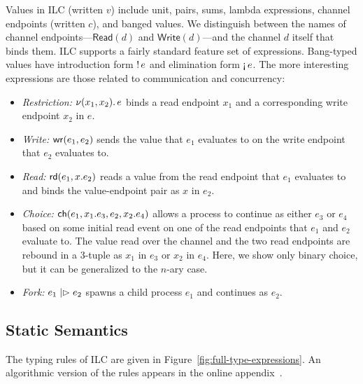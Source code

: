 Values in ILC (written $v$) include unit, pairs, sums, lambda expressions,
channel endpoints (written $c$), and banged values. We distinguish between the
names of channel endpoints---$\mathsf{Read}(d)$ and $\mathsf{Write}(d)$---and
the channel $d$ itself that binds them. ILC supports a fairly standard feature
set of expressions. Bang-typed values have introduction form ${!}\,{e}$ and
elimination form $\textnormal{!`}\,{e}$. The more interesting expressions are those
related to communication and concurrency:
\begin{itemize}[leftmargin=*]
  \item \emph{Restriction:} $\nu(x_1, x_2).\,e$ binds a read endpoint $x_1$ and
    a corresponding write endpoint $x_2$ in $e$.
  \item \emph{Write:} $\textnormal{\textsf{wr}}\mathsf{(}{e_1},{e_2}\mathsf{)}$ sends the value that $e_1$ evaluates to on
    the write endpoint that $e_2$ evaluates to.
  \item \emph{Read:} $\textnormal{\textsf{rd}}\mathsf{(}{e_1},{x}.{e_2}\mathsf{)}$ reads a value from the read endpoint
    that $e_1$ evaluates to and binds the value-endpoint pair as $x$ in $e_2$.
  \item \emph{Choice:} $\textnormal{\textsf{ch}}\mathsf{(}{e_1},{x_1}.{e_3},{e_2},{x_2}.{e_4}\mathsf{)}$ allows a
    process to continue as either $e_3$ or $e_4$ based on some initial read
    event on one of the read endpoints that $e_1$ and $e_2$ evaluate to. The value read
    over the channel and the two read endpoints are rebound in a 3-tuple as $x_1$
    in $e_3$ or $x_2$ in $e_4$. Here, we show only binary choice, but it can be
    generalized to the $n$-ary case.
  \item \emph{Fork:} $e_1 \mathrel{|\rhd} e_2$ spawns a child process $e_1$ and
    continues as $e_2$.
\end{itemize}

\subsection{Static Semantics}
\label{subsec:types}

The typing rules of ILC are given in Figure~\ref{fig:full-type-expressions}. An
algorithmic version of the rules appears in the online
appendix~\cite{liao2019ilc}.

